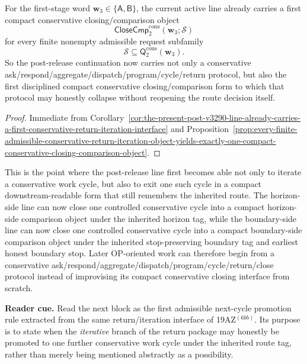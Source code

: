 \begin{corollary}
\label{cor:the-present-post-v3290-line-already-carries-a-first-compact-conservative-closing-comparison-form}
For the first-stage word \(\mathbf w_3\in\{\mathsf A,\mathsf B\}\), the current active line already carries a first compact conservative closing/comparison object
\[
  \mathsf{CloseCmp}^{\mathrm{cons}}_{2}(\mathbf w_3;\mathcal S)
\]
for every finite nonempty admissible request subfamily
\[
  \mathcal S\subseteq \mathsf{Q}^{\mathrm{cons}}_{2}(\mathbf w_3).
\]
So the post-release continuation now carries not only a conservative ask/respond/aggregate/dispatch/program/cycle/return protocol, but also the first disciplined compact conservative closing/comparison form to which that protocol may honestly collapse without reopening the route decision itself.
\end{corollary}

\begin{proof}
Immediate from Corollary~\ref{cor:the-present-post-v3290-line-already-carries-a-first-conservative-return-iteration-interface} and Proposition~\ref{prop:every-finite-admissible-conservative-return-iteration-object-yields-exactly-one-compact-conservative-closing-comparison-object}.
\end{proof}

\begin{remark}
\label{rem:what-the-first-compact-conservative-closing-comparison-form-now-buys}
This is the point where the post-release line first becomes able not only to iterate a conservative work cycle, but also to exit one such cycle in a compact downstream-readable form that still remembers the inherited route. The horizon-side line can now close one controlled conservative cycle into a compact horizon-side comparison object under the inherited horizon tag, while the boundary-side line can now close one controlled conservative cycle into a compact boundary-side comparison object under the inherited stop-preserving boundary tag and earliest honest boundary stop. Later OP-oriented work can therefore begin from a conservative ask/respond/aggregate/dispatch/program/cycle/return/close protocol instead of improvising its compact conservative closing interface from scratch.
\end{remark}


\noindent\textbf{Reader cue.} Read the next block as the first admissible next-cycle promotion rule extracted from the same return/iteration interface of 19AZ$^{(6bb)}$. Its purpose is to state when the \emph{iterative} branch of the return package may honestly be promoted to one further conservative work cycle under the inherited route tag, rather than merely being mentioned abstractly as a possibility.

